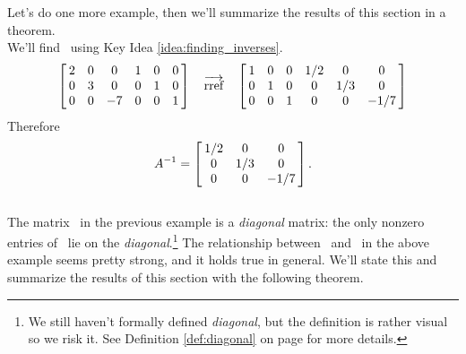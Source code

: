 Let's do one more example, then we'll summarize the results of this section in a theorem.\\

{We'll find \ttai\ using Key Idea \ref{idea:finding_inverses}.
$$\bmx{cccccc} 2&0&0&1&0&0\\0&3&0&0&1&0\\0&0&-7&0&0&1\emx \quad \overrightarrow{\text{rref}} \quad
\bmx{cccccc} 1&0&0&1/2&0&0\\0&1&0&0&1/3&0\\0&0&1&0&0&-1/7\emx$$
Therefore $$\ttai = \bmx{ccc} 1/2 & 0 & 0 \\ 0 & 1/3 & 0 \\ 0 & 0 & -1/7\emx.$$
\ }\\ %

The matrix \tta\ in the previous example is a \textit{diagonal} matrix: the only nonzero entries of \tta\ lie on the \textit{diagonal}.\footnote{We still haven't formally defined \textit{diagonal}, but the definition is rather visual so we risk it.  See Definition \ref{def:diagonal} on page \pageref{def:diagonal} for more details.}  The relationship between \tta\ and \ttai\ in the above example seems pretty strong, and it holds true in general. We'll state this and summarize the results of this section with the following theorem.


